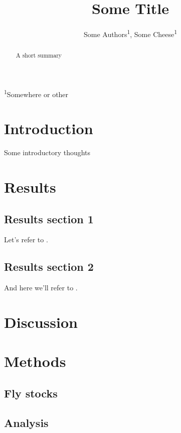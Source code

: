 \documentclass[11pt,british,super,sort&compress]{article}
\newcommand{\lyxaddress}[1]{
\par {\raggedright #1
\vspace{1.4em}
\noindent\par}
}
\begin{document}
\title{Some Title}


\author{Some Authors\textsuperscript{1}, Some Cheese\textsuperscript{1}}

\maketitle

\lyxaddress{\textsuperscript{1}Somewhere or other}
\begin{abstract}
A short summary

\newpage{}
\end{abstract}

\section{Introduction}

Some introductory thoughts


\section{Results}


\subsection{Results section 1}

Let's refer to .


\subsection{Results section 2}

And here we'll refer to .


\section{Discussion}


\section{Methods}


\subsection{Fly stocks}


\subsection{Analysis}
\end{document}

